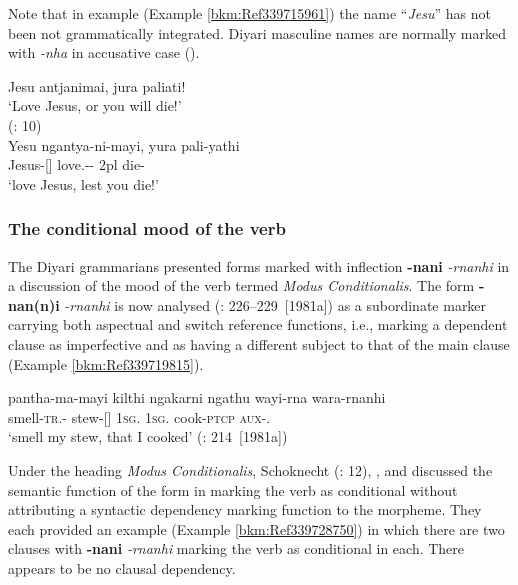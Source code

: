 Note that in example (Example \ref{bkm:Ref339715961}) the name “\textit{Jesu}” has not been not grammatically integrated. Diyari masculine names are normally marked with \textit{-nha} in accusative case ().

\ea
\label{bkm:Ref339715961}Jesu antjanimai, jura paliati!\\
\glt `Love Jesus, or you will die!' \\
(\citealt{schoknecht_grammar_1947}: 10) \\
\gll Yesu ngantya-ni-mayi, yura pali-yathi \\
Jesus-[] love.-- 2pl die-\\
\glt `love Jesus, lest you die!'
\z


\subsubsection{The conditional mood of the verb}
\label{sec:key:8.7.3.2}\label{bkm:Ref74048540}

The Diyari grammarians presented forms marked with inflection \textbf{-nani} \textit{-rnanhi} in a discussion of the mood of the verb termed \textit{Modus Conditionalis}. The form \textbf{-nan(n)i} \textit{-rnanhi} is now analysed (\citealt{austin_grammar_2013}: 226--229~[1981a]) as a subordinate marker carrying both aspectual and switch reference functions, i.e., marking a dependent clause as imperfective and as having a different subject to that of the main clause (Example \ref{bkm:Ref339719815}).

\ea\label{bkm:Ref339719815}
\gll pantha-ma-mayi kilthi ngakarni ngathu wayi-rna wara-rnanhi \\
 smell-\textsc{tr}.- stew-[] 1\textsc{sg}. 1\textsc{sg}. cook-\textsc{ptcp} \textsc{aux}-. \\
\glt `smell my stew, that I cooked'
(\citealt{austin_grammar_2013}: 214~[1981a])
\z

Under the heading \textit{Modus Conditionalis}, Schoknecht (\citeyear{schoknecht_grammar_1947}: 12), \citet{flierl_dieri_1880}, and \citet{reuther_dieri_1894} discussed the semantic function of the form in marking the verb as conditional without attributing a syntactic dependency marking function to the morpheme. They each provided an example (Example \ref{bkm:Ref339728750}) in which there are two clauses with \textbf{-nani} \textit{-rnanhi} marking the verb as conditional in each. There appears to be no clausal dependency.

